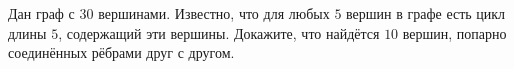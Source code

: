 \documentclass{article}
\begin{document}
Дан граф с $30$ вершинами. Известно, что для любых $5$ вершин в графе есть цикл длины $5$, содержащий эти вершины. 
Докажите, что найдётся $10$ вершин, попарно соединённых рёбрами друг с другом.
\end{document}

